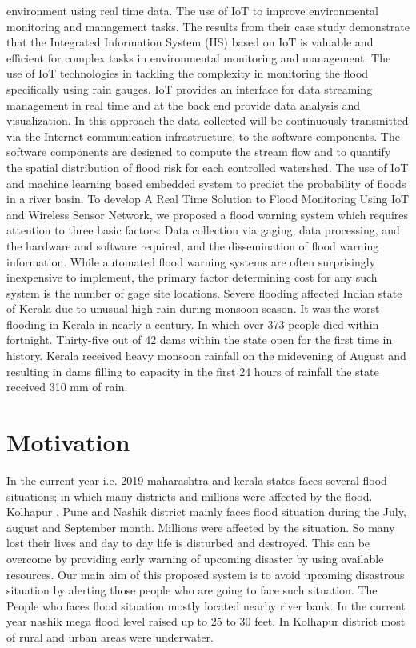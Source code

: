 \documentclass[a4paper,12pt]{report}
\begin{document}
environment using real time data. The use of IoT to improve environmental monitoring and management tasks. The results from their case study demonstrate that the Integrated Information System (IIS) based on IoT is valuable and efficient for complex tasks in environmental monitoring and management. The use of IoT technologies in tackling the complexity in monitoring the flood specifically using rain gauges. IoT provides an interface for data streaming management in real time and at the back end provide data analysis and visualization. In this approach the data collected will be continuously transmitted via the Internet communication infrastructure, to the software components. The software components are designed to compute the stream flow and to quantify the spatial distribution of flood risk for each controlled watershed. The use of IoT and machine learning based embedded system to predict the probability of floods in a river basin. To develop A Real Time Solution to Flood Monitoring Using IoT and Wireless Sensor Network, we proposed a flood warning system which requires attention to three basic factors: Data collection via gaging, data processing, and the hardware and software required, and the dissemination of flood warning information. While automated flood warning systems are often surprisingly inexpensive to implement, the primary factor determining cost for any such system is the number of gage site locations. Severe flooding affected Indian state of Kerala due to unusual high rain during monsoon season. It was the worst flooding in Kerala in nearly a century. In which over 373 people died within fortnight. Thirty-five out of 42 dams within the state open for the first time in history. Kerala received heavy monsoon rainfall on the midevening of August and resulting in dams filling to capacity in the first 24 hours of rainfall the state received 310 mm of rain.
 

\section{Motivation}
In the current year i.e. 2019 maharashtra and kerala states faces several flood situations; in which many districts and millions were affected by the flood. Kolhapur , Pune and Nashik district mainly faces flood situation during the July, august and September month.    Millions were affected by the situation. So many lost their lives and day to day life is disturbed and destroyed.
This can be overcome by providing early warning of upcoming disaster by using available resources.   Our main aim of this proposed system is to avoid upcoming disastrous situation by alerting those people who are going to face such situation.
The People who faces flood situation mostly located nearby river bank. In the current year nashik mega flood level raised up to 25 to 30 feet. In Kolhapur district most of rural and urban areas were underwater.
\end{document}
